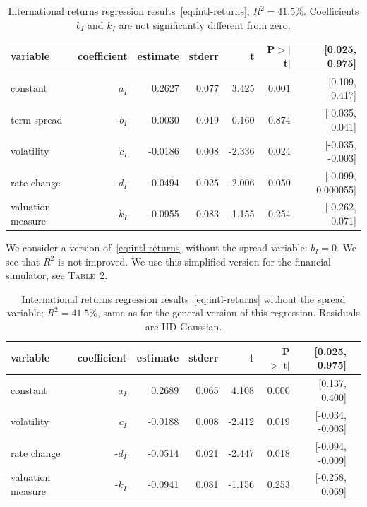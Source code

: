 \documentclass[12pt]{amsart}
\begin{document}
\begin{table}[h]
\centering
\begin{tabular}{lrrrrrr}
\hline
\textbf{variable} & \textbf{coefficient} & \textbf{estimate} & \textbf{stderr} & \textbf{t} & \textbf{P$>\vert$t$\vert$} & \textbf{[0.025, 0.975]} \\
\hline
constant  & $a_I$    & 0.2627 & 0.077 & 3.425  & 0.001 & [0.109, 0.417] \\
term spread  & -$b_I$   & 0.0030  & 0.019 & 0.160  & 0.874 & [-0.035, 0.041] \\
volatility     & $c_I$    & -0.0186 & 0.008 & -2.336 & 0.024 & [-0.035, -0.003] \\
rate change & -$d_I$  & -0.0494 & 0.025 & -2.006 & 0.050 & [-0.099, 0.000055] \\
valuation measure  & -$k_I$ & -0.0955 & 0.083 & -1.155 & 0.254 & [-0.262, 0.071] \\
\hline
\end{tabular}
\caption{International returns regression results~\eqref{eq:intl-returns}; $R^2 = 41.5\%$. Coefficients $b_I$ and $k_I$ are not significantly different from zero.}
\label{table:intl-regression-results}
\end{table}

We consider a version of~\eqref{eq:intl-returns} without the spread variable: $b_I = 0$. We see that $R^2$ is not improved. We use this simplified version for the financial simulator, see \textsc{Table}~\ref{table:intl-regression-results-cut}.

\begin{table}[h]
\centering
\begin{tabular}{lrrrrrrr}
\hline
\textbf{variable} & \textbf{coefficient} & \textbf{estimate} & \textbf{stderr} & \textbf{t} & \textbf{P$>|\text{t}|$} & \textbf{[0.025, 0.975]} \\
\hline
constant   &  $a_I$  & 0.2689 & 0.065 & 4.108 & 0.000 & [0.137, 0.400] \\
volatility     & $c_I$     & -0.0188 & 0.008 & -2.412 & 0.019 & [-0.034, -0.003] \\
rate change & -$d_I$ & -0.0514 & 0.021 & -2.447 & 0.018 & [-0.094, -0.009] \\
valuation measure    & -$k_I$ & -0.0941 & 0.081 & -1.156 & 0.253 & [-0.258, 0.069] \\
\hline
\end{tabular}
\caption{International returns regression results~\eqref{eq:intl-returns} without the spread variable; $R^2 = 41.5\%$, same as for the general version of this regression. Residuals are IID Gaussian.}
\label{table:intl-regression-results-cut}
\end{table}
\end{document}
